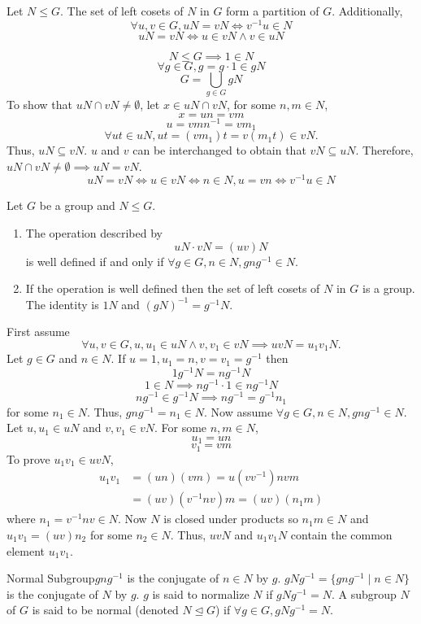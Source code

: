 \documentclass{report}
\newcommand{\mprop}[2]{\begin{Prop}{#1}{}#2\end{Prop}}
\newcommand{\dfn}[2]{\begin{Definition}[colbacktitle=red!75!black]{#1}{}#2\end{Definition}}
\newenvironment{myproof}[1][\proofname]{%
	\proof[\bfseries #1: ]%
}{\endproof}
\begin{document}
\mprop{}{Let $N \leq G$. The set of left cosets of $N$ in $G$ form a partition of $G$. Additionally, $$\forall u,v \in G, uN = vN \iff v^{-1} u \in N$$
$$uN = vN \iff u \in vN \land v \in uN$$}
\begin{myproof}
    $$N \leq G \implies 1 \in N$$
    $$\forall g \in G, g = g\cdot 1 \in gN$$
    $$G = \bigcup_{g \in G} gN$$
    To show that $uN \cap vN \neq \emptyset$, let $x \in uN \cap vN$, for some $n,m \in N$, 
    $$x = un = vm$$
    $$u = vmn^{-1} = vm_1$$
    $$\forall ut \in uN, ut = (vm_1)t = v(m_1 t) \in vN.$$
    Thus, $uN \subseteq vN$. $u$ and $v$ can be interchanged to obtain that $vN \subseteq uN$. Therefore, $uN \cap vN \neq \emptyset \implies uN = vN$.  
    $$uN = vN \iff u \in vN \iff n \in N, u =vn \iff v^{-1} u \in N$$
\end{myproof}
\mprop{}{Let $G$ be a group and $N \leq G$. 
\begin{enumerate}
    \item The operation described by 
    $$uN \cdot vN = (uv) N$$
    is well defined if and only if $\forall g \in G, n \in N, gng^{-1} \in N$. 
    \item If the operation is well defined then the set of left cosets of $N$ in $G$ is a group. The identity is $1N$ and $(gN)^{-1} = g^{-1}N.$
\end{enumerate}}
\begin{myproof}
    First assume $$\forall u,v \in G, u,u_1 \in uN \land v,v_1 \in vN \implies uvN = u_1 v_1 N.$$
    Let $g \in G$ and $n \in N$. If $u = 1, u_1 = n, v = v_1 = g^{-1}$ then 
    $$1g^{-1} N = ng^{-1} N$$
    $$1 \in N \implies ng^{-1} \cdot 1 \in ng^{-1} N$$
    $$ng^{-1} \in g^{-1} N \implies ng^{-1} = g^{-1}n_1$$
    for some $n_1 \in N$. Thus, $gng^{-1} = n_1 \in N$. Now assume $\forall g \in G, n \in N, gng^{-1} \in N$. Let $u,u_1 \in uN$ and $v,v_1 \in vN$. For some $n,m \in N$, 
    $$u_1 = un$$
    $$v_1 = vm$$
    To prove $u_1 v_1 \in uvN$, 
    \begin{align*}
    u_1 v_1 &= (un)(vm) = u(vv^{-1})nvm\\
    &= (uv)(v^{-1}nv)m = (uv)(n_1m)
    \end{align*}
    where $n_1 = v^{-1} n v \in N$. Now $N$ is closed under products so $n_1 m \in N$ and $u_1 v_1 = (uv)n_2$ for some $n_2 \in N$. Thus, $uvN$ and $u_1 v_1 N$ contain the common element $u_1 v_1$. 
\end{myproof}
\dfn{Normal Subgroup}{$gng^{-1}$ is the conjugate of $n \in N$ by $g$. $gNg^{-1} = \{gng^{-1} \mid n \in N\}$ is the conjugate of $N$ by $g$. $g$ is said to normalize $N$ if $gNg^{-1} = N$. A subgroup $N$ of $G$ is said to be normal (denoted $N\unlhd G$) if $\forall g \in G, gNg^{-1} = N$.}
\end{document}
